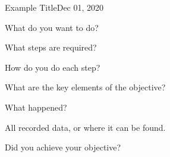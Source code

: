 \begin{entry}{Example Title}{Dec 01, 2020}
    \objective 
    
    What do you want to do?
    
    \outline
    
    What steps are required?
    
    \procedures
    
    How do you do each step?
    
    \parameters
    
    What are the key elements of the objective?
    
    \observations
    
    What happened?
    
    \data
    
    All recorded data, or where it can be found.
    
    \results
    
    Did you achieve your objective?
    
\end{entry}


